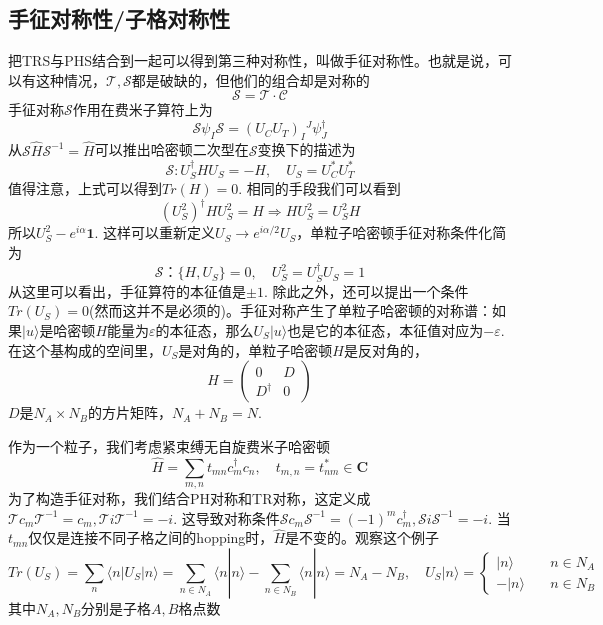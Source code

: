 \documentclass{article}
\numberwithin{equation}{subsection}
\newcommand{\mT}{\mathcal{T}}
\newcommand{\mC}{\mathcal{C}}
\newcommand{\mS}{\mathcal{S}}
\begin{document}
\subsection{手征对称性/子格对称性}
把TRS与PHS结合到一起可以得到第三种对称性，叫做手征对称性。也就是说，可以有这种情况，$\mT,\mS$都是破缺的，但他们的组合却是对称的
\begin{equation}
    \mS=\mT\cdot\mC
\end{equation}
手征对称$\mS$作用在费米子算符上为
\begin{equation}
    \mS \psi_I\mS=(U_CU_T)_{I}{}^J\psi_J^\dagger
\end{equation}
从$\mS\hat{H}\mS^{-1}=\hat{H}$可以推出哈密顿二次型在$\mS$变换下的描述为
\begin{equation}
    \mS:U_S^\dagger HU_S=-H,\quad U_S=U_C^*U_T^*
\end{equation}
值得注意，上式可以得到$Tr(H)=0$. 相同的手段我们可以看到
\begin{equation}
    (U_S^2)^\dagger HU_S^2=H\Rightarrow HU_S^2=U_S^2 H
\end{equation}
所以$U_S^2-e^{i\alpha}\mathbf{1}$. 这样可以重新定义$U_S\rightarrow e^{i\alpha/2}U_S$，单粒子哈密顿手征对称条件化简为
\begin{equation}
    \mS：\{H,U_S\}=0,\quad U_S^2=U_S^\dagger U_S=1
\end{equation}
从这里可以看出，手征算符的本征值是$\pm 1$. 除此之外，还可以提出一个条件$Tr(U_S)=0$(然而这并不是必须的)。手征对称产生了单粒子哈密顿的对称谱：如果$|u\rangle$是哈密顿$H$能量为$\varepsilon$的本征态，那么$U_S|u\rangle$也是它的本征态，本征值对应为$-\varepsilon$. 在这个基构成的空间里，$U_S$是对角的，单粒子哈密顿$H$是反对角的，
\begin{equation}
    H=\begin{pmatrix}
        0&D\\
        D^\dagger&0
    \end{pmatrix}
\end{equation}
$D$是$N_A\times N_B$的方片矩阵，$N_A+N_B=N$.

作为一个粒子，我们考虑紧束缚无自旋费米子哈密顿
\begin{equation}
    \hat{H}=\sum_{m,n}t_{mn}c_m^\dagger c_n,\quad t_{m,n}=t_{nm}^*\in\mathbf{C}
\end{equation}
为了构造手征对称，我们结合PH对称和TR对称，这定义成$\mT c_m\mT^{-1}=c_m,\mT i\mT^{-1}=-i$. 这导致对称条件$\mS c_m\mS^{-1}=(-1)^m c_m^\dagger, \mS i\mS^{-1}=-i$. 当$t_{mn}$仅仅是连接不同子格之间的hopping时，$\hat{H}$是不变的。观察这个例子
\begin{equation}
    Tr(U_S)=\sum_{n}\langle n|U_S|n\rangle=\sum_{n\in N_A}\langle n|n\rangle-\sum_{n\in N_B}\langle n|n\rangle=N_A-N_B,\quad U_S|n\rangle=\begin{cases}
        |n\rangle\quad &n\in N_A\\
        -|n\rangle\quad &n\in N_B
    \end{cases}
\end{equation}
其中$N_A,N_B$分别是子格$A,B$格点数
\end{document}
